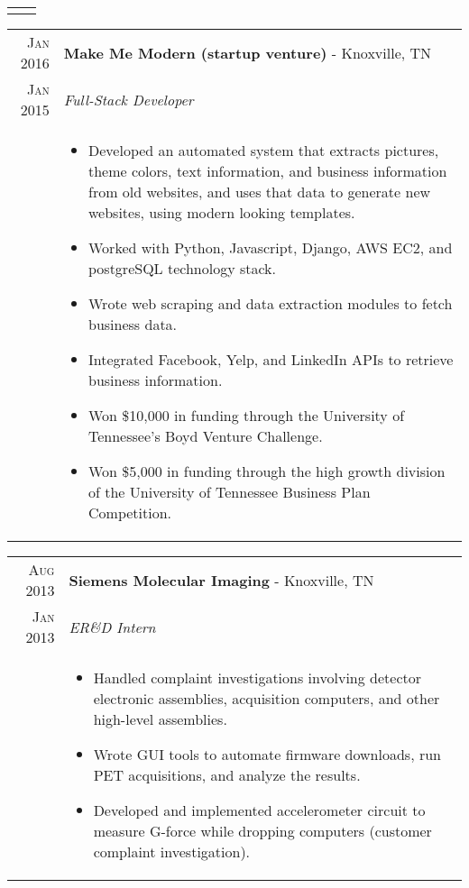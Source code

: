 \documentclass[a4paper,11pt]{article}
\begin{document}
\begin{tabularx}{\textwidth}{R|X}
{\begin{itemize}[leftmargin=20pt,topsep=1pt,itemsep=1pt,partopsep=0pt, parsep=1pt]
      \vspace{-0.5cm}
      \end{itemize}}\\
\end{tabularx}

\begin{tabularx}{\textwidth}{R|X}
   \textsc{Jan 2016} & \textbf{Make Me Modern (startup venture)} \-- Knoxville, TN\\
   \textsc{Jan 2015} & \emph{Full-Stack Developer}\\
   & \small{
      \begin{itemize}[leftmargin=20pt,topsep=1pt,itemsep=1pt,partopsep=0pt, parsep=1pt]
         \item Developed an automated system that extracts pictures, theme colors, text information, and business information from old websites, and uses that data to generate new websites, using modern looking templates.
         \item Worked with Python, Javascript, Django, AWS EC2, and postgreSQL technology stack.
         \item Wrote web scraping and data extraction modules to fetch business data.
         \item Integrated Facebook, Yelp, and LinkedIn APIs to retrieve business information.
         \item Won \$10,000 in funding through the University of Tennessee's Boyd Venture Challenge.
         \item Won \$5,000 in funding through the high growth division of the University of Tennessee Business Plan Competition.
      \vspace{-0.5cm}
      \end{itemize}}\\
\end{tabularx}

\begin{tabularx}{\textwidth}{R|X}
   \textsc{Aug 2013} & \textbf{Siemens Molecular Imaging} \-- Knoxville, TN\\
   \textsc{Jan 2013} & \emph{ER\&D Intern}\\
   & \small{
      \begin{itemize}[leftmargin=20pt,topsep=1pt,itemsep=1pt,partopsep=0pt, parsep=1pt]
         \item Handled complaint investigations involving detector electronic assemblies, acquisition computers, and other high-level assemblies.
         \item Wrote GUI tools to automate firmware downloads, run PET acquisitions, and analyze the results.
         \item Developed and implemented accelerometer circuit to measure G-force while dropping computers (customer complaint investigation).
      \vspace{-0.5cm}
      \end{itemize}}\\
\end{tabularx}
\end{document}
